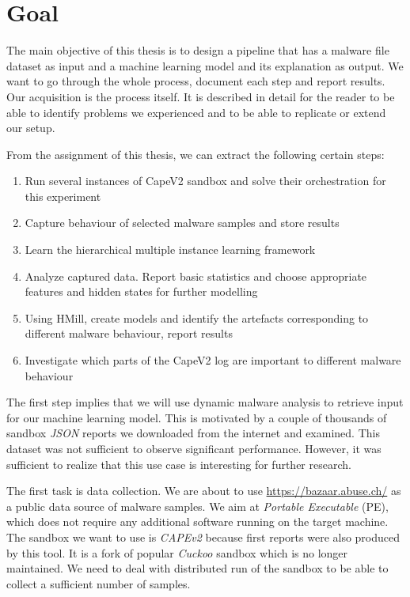 \section*{Goal}
The main objective of this thesis is to design a pipeline that has a malware file dataset as input and a machine learning model and its explanation as output. We want to go through the whole process, document each step and report results. Our acquisition is the process itself. It is described in detail for the reader to be able to identify problems we experienced and to be able to replicate or extend our setup.

From the assignment of this thesis, we can extract the following certain steps:
\begin{enumerate}
    \itemsep0em 
    \item Run several instances of CapeV2 \cite{Cape} sandbox and solve their orchestration for this experiment
    \item Capture behaviour of selected malware samples and store results
    \item Learn the hierarchical multiple instance learning framework
    \item Analyze captured data. Report basic statistics and choose appropriate features and hidden states for further modelling
    \item Using HMill, create models and identify the artefacts corresponding to different malware behaviour, report results
    \item Investigate which parts of the CapeV2 log are important to different malware behaviour
\end{enumerate}

The first step implies that we will use dynamic malware analysis to retrieve input for our machine learning model. This is motivated by a couple of thousands of sandbox \emph{JSON} reports we downloaded from the internet and examined. This dataset was not sufficient to observe significant performance. However, it was sufficient to realize that this use case is interesting for further research.

The first task is data collection. We are about to use \url{https://bazaar.abuse.ch/} as a public data source of malware samples. We aim at \emph{Portable Executable} (PE), which does not require any additional software running on the target machine. The sandbox we want to use is \emph{CAPEv2} \cite{Cape} because first reports were also produced by this tool.  It is a fork of popular \emph{Cuckoo} sandbox which is no longer maintained. We need to deal with distributed run of the sandbox to be able to collect a sufficient number of samples.

